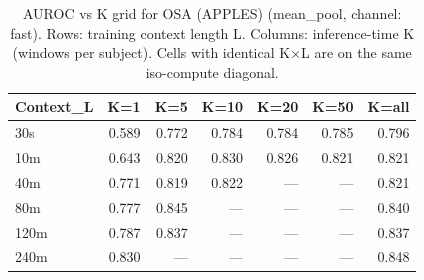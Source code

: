 \begin{table}[ht]
\centering
\caption{AUROC vs K grid for OSA (APPLES) (mean_pool, channel: fast). Rows: training context length L. Columns: inference-time K (windows per subject). Cells with identical K×L are on the same iso-compute diagonal.}
\label{tab:kgrid_osa_binary_apples_postqc_mean_pool_fast}
\begin{tabular}{lrrrrrr}
\toprule
Context_L & K=1 & K=5 & K=10 & K=20 & K=50 & K=all \\
\midrule
30s & 0.589 & 0.772 & 0.784 & 0.784 & 0.785 & 0.796 \\
10m & 0.643 & 0.820 & 0.830 & 0.826 & 0.821 & 0.821 \\
40m & 0.771 & 0.819 & 0.822 & — & — & 0.821 \\
80m & 0.777 & 0.845 & — & — & — & 0.840 \\
120m & 0.787 & 0.837 & — & — & — & 0.837 \\
240m & 0.830 & — & — & — & — & 0.848 \\
\bottomrule
\end{tabular}
\end{table}